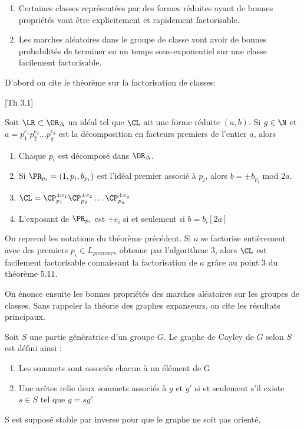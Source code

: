 \begin{enumerate}
	\item Certaines classes représentées par des formes réduites ayant de bonnes propriétés vont être explicitement et rapidement factorisable.
	\item Les marches aléatoires dans le groupe de classe vont avoir de bonnes probabilités de terminer en un temps sous-exponentiel sur une classe facilement factorisable.
\end{enumerate}

D'abord on cite le théorème sur la factorisation de classes:

\begin{The}\cite{Seysen}[Th 3.1]
	
	Soit $\LR\subset\OR_{\Delta}$ un idéal tel que $\CL$ ait une forme réduite $(a,b)$. Si $g\in\N$ et $a = p_{1}^{e_{1}}p_{2}^{e_{2}}\ldots p_{g}^{e_{g}}$ est la décomposition en facteurs premiers de l'entier $a$, alors
	\begin{enumerate}
		\item Chaque $p_{i}$ est décomposé dans $\OR_{\Delta}$.
		\item Si $\PR_{p_{i}} = (1,p_{i},b_{p_{i}})$ est l'idéal premier associé à $p_{i}$, alors $b = \pm b_{p_{i}} $ mod $2a$.
		\item $\CL = \CP_{p_{1}}^{\pm e_{1}}\CP_{p_{2}}^{\pm e_{2}}\ldots\CP_{p_{g}}^{\pm e_{g}}$ 
		\item L'exposant de $\PR_{p_{i}}$ est $+e_{i}$ si et seulement si $b = b_{i} [2a]$
	\end{enumerate}
\end{The}

\begin{Coro}
	On reprend les notations du théorème précédent. Si $a$ se factorise entièrement avec des premiers $p_{i}\in L_{premiers}$ obtenue par l'algorithme 3, alors $\CL$ est facilement factorisable connaissant la factorisation de $a$ grâce au point 3 du théorème 5.11. 
\end{Coro}

On énonce ensuite les bonnes propriétés des marches aléatoires sur les groupes de classes. Sans rappeler la théorie des graphes expanseurs, on cite les résultats principaux.

\begin{Def}
	Soit $S$ une partie génératrice d'un groupe $G$. Le graphe de Cayley de $G$ selon $S$ est défini ainsi :
	\begin{enumerate}
		\item Les sommets sont associés chacun à un élément de G
		\item Une arêtes relie deux sommets associés à $g$ et $g'$ si et seulement s'il existe $s\in S$ tel que $g = sg'$
	\end{enumerate}
	S est supposé stable par inverse pour que le graphe ne soit pas orienté.
\end{Def}

